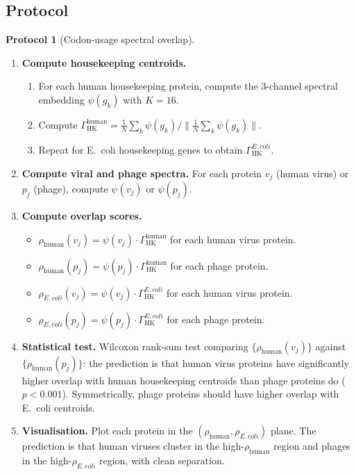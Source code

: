 \documentclass[11pt,a4paper]{article}
\theoremstyle{expthm}
\theoremstyle{definition}
\newtheorem{protocol}[theorem]{Protocol}
\theoremstyle{remark}
\newcommand{\norm}[1]{\lVert#1\rVert}
\begin{document}
\subsection{Protocol}

\begin{protocol}[Codon-usage spectral overlap]
\label{prot:codon}
\leavevmode
\begin{enumerate}[leftmargin=1.4em,itemsep=3pt]
\item \textbf{Compute housekeeping centroids.}
  \begin{enumerate}[label=(\roman*),leftmargin=1.8em]
  \item For each human housekeeping protein, compute the 3-channel
    spectral embedding $\psi(g_k)$ with $K = 16$.
  \item Compute
    $\Gamma_{\mathrm{HK}}^{\mathrm{human}} =
    \frac{1}{N}\sum_k \psi(g_k) /
    \norm{\frac{1}{N}\sum_k \psi(g_k)}$.
  \item Repeat for E.\ coli housekeeping genes to obtain
    $\Gamma_{\mathrm{HK}}^{E.\,coli}$.
  \end{enumerate}
\item \textbf{Compute viral and phage spectra.} For each protein $v_j$
  (human virus) or $p_j$ (phage), compute $\psi(v_j)$ or $\psi(p_j)$.
\item \textbf{Compute overlap scores.}
  \begin{itemize}[leftmargin=1.2em,itemsep=1pt]
  \item $\rho_{\mathrm{human}}(v_j) =
    \psi(v_j) \cdot \Gamma_{\mathrm{HK}}^{\mathrm{human}}$
    for each human virus protein.
  \item $\rho_{\mathrm{human}}(p_j) =
    \psi(p_j) \cdot \Gamma_{\mathrm{HK}}^{\mathrm{human}}$
    for each phage protein.
  \item $\rho_{E.\,coli}(v_j) =
    \psi(v_j) \cdot \Gamma_{\mathrm{HK}}^{E.\,coli}$
    for each human virus protein.
  \item $\rho_{E.\,coli}(p_j) =
    \psi(p_j) \cdot \Gamma_{\mathrm{HK}}^{E.\,coli}$
    for each phage protein.
  \end{itemize}
\item \textbf{Statistical test.} Wilcoxon rank-sum test comparing
  $\{\rho_{\mathrm{human}}(v_j)\}$ against
  $\{\rho_{\mathrm{human}}(p_j)\}$: the prediction is that human virus
  proteins have significantly higher overlap with human housekeeping
  centroids than phage proteins do ($p < 0.001$). Symmetrically, phage
  proteins should have higher overlap with E.\ coli centroids.
\item \textbf{Visualisation.} Plot each protein in the
  $(\rho_{\mathrm{human}}, \rho_{E.\,coli})$ plane. The prediction is
  that human viruses cluster in the high-$\rho_{\mathrm{human}}$ region
  and phages in the high-$\rho_{E.\,coli}$ region, with clean
  separation.
\end{enumerate}
\end{protocol}
\end{document}
